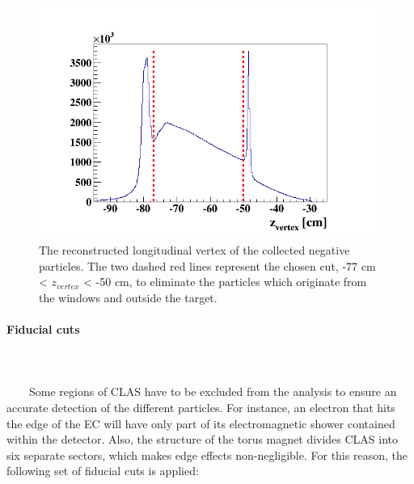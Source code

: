 \begin{itemize}
\begin{figure}[tp]
\centering
\includegraphics[scale=0.43]{fig_analysis/Z_e.png}
\caption{The reconstructed longitudinal vertex of the collected negative particles. The two dashed red lines represent the chosen cut, -77 cm < $z_{vertex}$ < -50 cm, to eliminate the particles which originate from the windows and outside the target.} 
\label{fig:z_cut}
\end{figure}

\paragraph{Fiducial cuts}
~\\
~\\
~~~~Some regions of CLAS have to be excluded from the analysis to ensure an accurate detection of the different particles. For instance, an electron that hits the edge of the EC will have only part of its electromagnetic shower contained within the detector. Also, the structure of the torus magnet divides CLAS into six separate sectors, which makes edge effects non-negligible. For this reason, the following set of fiducial cuts is applied:      
 

\end{itemize}
